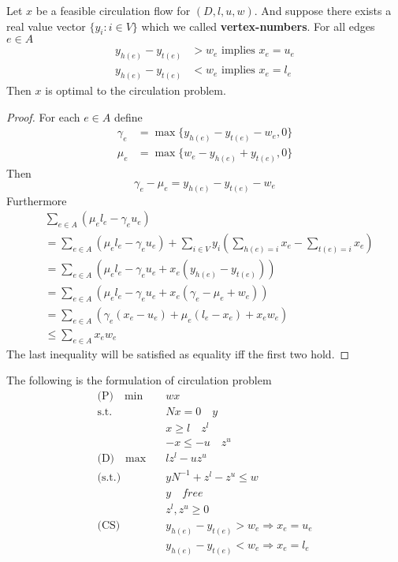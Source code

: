 			\begin{theorem}
				Let $x$ be a feasible circulation flow for $(D, l, u, w)$. And suppose there exists a real value vector $\{y_i: i \in V\}$ which we called \textbf{vertex-numbers}. For all edges $e\in A$
				\begin{align}
					y_{h(e)} - y_{t(e)} &> w_e \text{ implies } x_e = u_e\\
					y_{h(e)} - y_{t(e)} &< w_e \text{ implies } x_e = l_e
				\end{align}
				Then $x$ is optimal to the circulation problem.
			\end{theorem}

			\begin{proof}
				For each $e \in A$ define
				\begin{align}
					\gamma_e &= \max\{y_{h(e)} - y_{t(e)} - w_e, 0\} \\
					\mu_e &= \max\{w_e - y_{h(e)} + y_{t(e)}, 0\}
				\end{align}
				Then
				\begin{equation}
					\gamma_e - \mu_e = y_{h(e)} - y_{t(e)} - w_e
				\end{equation}
				Furthermore
				\begin{align}
					&\sum_{e\in A} (\mu_el_e - \gamma_eu_e) \\
					&= \sum_{e\in A} (\mu_el_e - \gamma_eu_e) + \sum_{i \in V}y_i(\sum_{h(e) = i} x_e - \sum_{t(e) = i} x_e)\\
					&= \sum_{e\in A} (\mu_el_e - \gamma_eu_e + x_e(y_{h(e)} - y_{t(e)}))\\
					&= \sum_{e\in A} (\mu_el_e - \gamma_eu_e + x_e(\gamma_e - \mu_e + w_e))\\
					&= \sum_{e\in A} (\gamma_e(x_e - u_e) + \mu_e(l_e - x_e) + x_ew_e)\\
					&\le \sum_{e\in A} x_ew_e 
				\end{align}
				The last inequality will be satisfied as equality iff the first two hold.
			\end{proof}

			The following is the formulation of circulation problem
			\begin{align}
				\text{(P)} \quad \min \quad & wx\\
				\text{s.t.} \quad & Nx = 0 \quad y \\
								  & x \ge l \quad z^l \\
								  & -x \le -u \quad z^u\\
				\text{(D)} \quad \max \quad & lz^l - uz^u \\
				\text{(s.t.)} \quad & yN^{-1} + z^l-z^u \le w\\
									& y \quad free\\
									&z^l, z^u \ge 0 \\
				\text{(CS)} \quad & y_{h(e)} - y_{t(e)} > w_e \Rightarrow x_e = u_e\\
								  & y_{h(e)} - y_{t(e)} < w_e \Rightarrow x_e = l_e
			\end{align}

